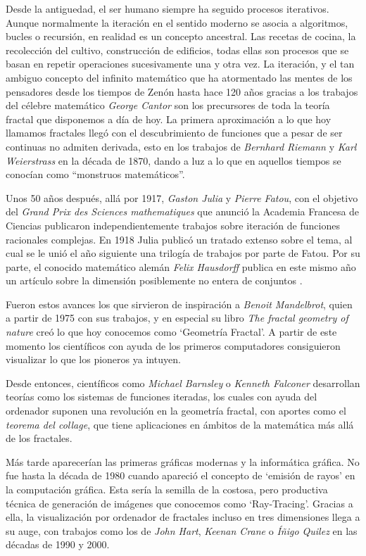 
Desde la antiguedad, el ser humano siempre ha seguido procesos iterativos. Aunque normalmente la iteración en el sentido moderno se asocia a algoritmos, bucles o recursión, en realidad es un concepto ancestral. Las recetas de cocina, la recolección del cultivo, construcción de edificios, todas ellas son procesos que se basan en repetir operaciones sucesivamente una y otra vez. La iteración, y el tan ambiguo concepto del infinito matemático que ha atormentado las mentes de los pensadores desde los tiempos de Zenón hasta hace 120 años gracias a los trabajos del célebre matemático \textit{George Cantor} son los precursores de toda la teoría fractal que disponemos a día de hoy. La primera aproximación a lo que hoy llamamos fractales llegó con el descubrimiento de funciones que a pesar de ser continuas no admiten derivada, esto en los trabajos de \textit{Bernhard Riemann} y \textit{Karl Weierstrass} en la década de 1870, dando a luz a lo que en aquellos tiempos se conocían como ``monstruos matemáticos''.

Unos 50 años después, allá por 1917, \textit{Gaston Julia} y \textit{Pierre Fatou}, con el objetivo del \textit{Grand Prix des Sciences mathematiques} que anunció la Academia Francesa de Ciencias publicaron independientemente trabajos sobre iteración de funciones racionales complejas. En 1918 Julia publicó un tratado extenso sobre el tema, al cual se le unió el año siguiente una trilogía de trabajos por parte de Fatou. Por su parte, el conocido matemático alemán \textit{Felix Hausdorff} publica en este mismo año un artículo sobre la dimensión posiblemente no entera de conjuntos \cite{Hausdorff1919}. 

Fueron estos avances los que sirvieron de inspiración a \textit{Benoit Mandelbrot}, quien a partir de 1975 con sus trabajos, y en especial su libro \textit{The fractal geometry of nature} \cite{alma991007242979704990} creó lo que hoy conocemos como `Geometría Fractal'. A partir de este momento los científicos con ayuda de los primeros computadores consiguieron visualizar lo que los pioneros ya intuyen.

Desde entonces, científicos como \textit{Michael Barnsley} o \textit{Kenneth Falconer} desarrollan teorías como los sistemas de funciones iteradas, los cuales con ayuda del ordenador suponen una revolución en la geometría fractal, con aportes como el \textit{teorema del collage}, que tiene aplicaciones en ámbitos de la matemática más allá de los fractales. 

Más tarde aparecerían las primeras gráficas modernas y la informática gráfica. No fue hasta la década de 1980 cuando apareció el concepto de `emisión de rayos' en la computación gráfica. Esta sería la semilla de la costosa, pero productiva técnica de generación de imágenes que conocemos como `Ray-Tracing'. Gracias a ella, la visualización por ordenador de fractales incluso en tres dimensiones llega a su auge, con trabajos como los de \textit{John Hart}, \textit{Keenan Crane} o \textit{Íñigo Quilez} en las décadas de 1990 y 2000.

